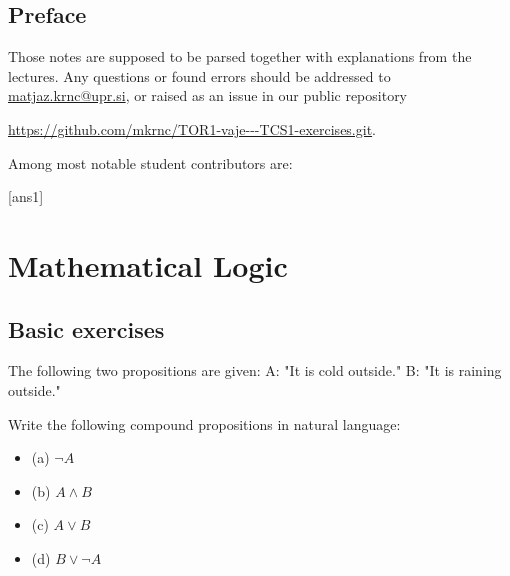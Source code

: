 \documentclass[11pt,paper=b5,footinclude,headinclude]{scrbook} %
\theoremstyle{remark}
\theoremstyle{definition} %
\theoremstyle{theorem} %
\newtheorem{ex}{Exercise\hypertarget{sol:\theex}}[chapter]
\newcommand{\myRepo}{\url{https://github.com/mkrnc/TOR1-vaje---TCS1-exercises.git}}
\begin{document}


\newpage
\section*{Preface}
   

Those notes are supposed to be parsed together with explanations from the lectures.
Any questions or found errors should be 
addressed to \url{matjaz.krnc@upr.si}, or 
raised as an issue in our public repository 
\begin{center}
    \myRepo.    
\end{center}


Among most notable student contributors are:




\tableofcontents
{}[ans1] 

\chapter{Mathematical Logic}
\section{Basic exercises}
\begin{ex}
    The following two propositions are given:
A: "It is cold outside."
B: "It is raining outside."

Write the following compound propositions in natural language:
\begin{itemize}
    \item (a) $\neg A$
    \item (b) $A \land B$
    \item (c) $A \lor B$
    \item (d) $B \lor \neg A$
\end{itemize}
\end{ex}
\end{document}
